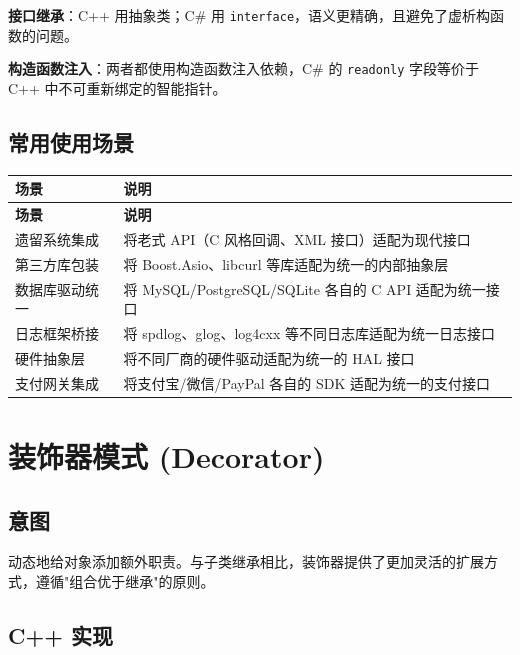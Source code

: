 \documentclass[12pt,a4paper,fontset=fandol]{ctexbook}
\begin{document}
\begin{compare}
\textbf{接口继承}：C++ 用抽象类；C\# 用 \texttt{interface}，语义更精确，且避免了虚析构函数的问题。

\textbf{构造函数注入}：两者都使用构造函数注入依赖，C\# 的 \texttt{readonly} 字段等价于 C++ 中不可重新绑定的智能指针。
\end{compare}

\section{常用使用场景}

\begin{longtable}{p{4.5cm} p{8.5cm}}
\toprule
\textbf{场景} & \textbf{说明} \\
\midrule
\endfirsthead
\toprule
\textbf{场景} & \textbf{说明} \\
\midrule
\endhead
\bottomrule
\endfoot
遗留系统集成 & 将老式 API（C 风格回调、XML 接口）适配为现代接口 \\
第三方库包装 & 将 Boost.Asio、libcurl 等库适配为统一的内部抽象层 \\
数据库驱动统一 & 将 MySQL/PostgreSQL/SQLite 各自的 C API 适配为统一接口 \\
日志框架桥接 & 将 spdlog、glog、log4cxx 等不同日志库适配为统一日志接口 \\
硬件抽象层 & 将不同厂商的硬件驱动适配为统一的 HAL 接口 \\
支付网关集成 & 将支付宝/微信/PayPal 各自的 SDK 适配为统一的支付接口 \\
\end{longtable}

\chapter{装饰器模式 (Decorator)}

\section{意图}

动态地给对象添加额外职责。与子类继承相比，装饰器提供了更加灵活的扩展方式，遵循"组合优于继承"的原则。

\section{C++ 实现}
\end{document}
